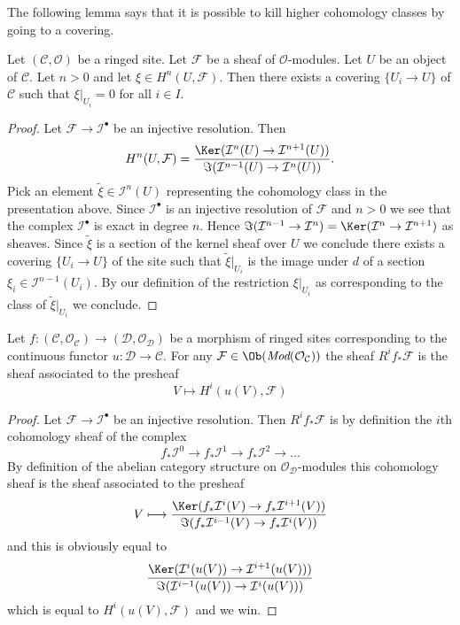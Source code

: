 \medskip\noindent
The following lemma says that it is possible to kill higher cohomology
classes by going to a covering.

\begin{lemma}
\label{lemma-kill-cohomology-class-on-covering}
Let $(\mathcal{C}, \mathcal{O})$ be a ringed site.
Let $\mathcal{F}$ be a sheaf of $\mathcal{O}$-modules.
Let $U$ be an object of $\mathcal{C}$.
Let $n > 0$ and let $\xi \in H^n(U, \mathcal{F})$.
Then there exists a covering $\{U_i \to U\}$ of $\mathcal{C}$
such that $\xi|_{U_i} = 0$ for all $i \in I$.
\end{lemma}

\begin{proof}
Let $\mathcal{F} \to \mathcal{I}^\bullet$ be an injective resolution.
Then
$$
H^n(U, \mathcal{F}) =
\frac{\Ker(\mathcal{I}^n(U) \to \mathcal{I}^{n + 1}(U))}
{\Im(\mathcal{I}^{n - 1}(U) \to \mathcal{I}^n(U))}.
$$
Pick an element $\tilde \xi \in \mathcal{I}^n(U)$ representing the
cohomology class in the presentation above. Since $\mathcal{I}^\bullet$
is an injective resolution of $\mathcal{F}$ and $n > 0$ we see that
the complex $\mathcal{I}^\bullet$ is exact in degree $n$. Hence
$\Im(\mathcal{I}^{n - 1} \to \mathcal{I}^n) =
\Ker(\mathcal{I}^n \to \mathcal{I}^{n + 1})$ as sheaves.
Since $\tilde \xi$ is a section of the kernel sheaf over $U$
we conclude there exists a covering $\{U_i \to U\}$ of the site
such that $\tilde \xi|_{U_i}$ is the image under $d$ of a section
$\xi_i \in \mathcal{I}^{n - 1}(U_i)$. By our definition of the
restriction $\xi|_{U_i}$ as corresponding to the class of
$\tilde \xi|_{U_i}$ we conclude.
\end{proof}

\begin{lemma}
\label{lemma-higher-direct-images}
Let $f : (\mathcal{C}, \mathcal{O}_\mathcal{C}) \to
(\mathcal{D}, \mathcal{O}_\mathcal{D})$ be a morphism of ringed sites
corresponding to the continuous functor $u : \mathcal{D} \to \mathcal{C}$.
For any $\mathcal{F} \in \Ob(\textit{Mod}(\mathcal{O}_\mathcal{C}))$
the sheaf $R^if_*\mathcal{F}$ is the sheaf associated to the
presheaf
$$
V \longmapsto H^i(u(V), \mathcal{F})
$$
\end{lemma}

\begin{proof}
Let $\mathcal{F} \to \mathcal{I}^\bullet$ be an injective resolution.
Then $R^if_*\mathcal{F}$ is by definition the $i$th cohomology sheaf
of the complex
$$
f_*\mathcal{I}^0 \to f_*\mathcal{I}^1 \to f_*\mathcal{I}^2 \to \ldots
$$
By definition of the abelian category structure on
$\mathcal{O}_\mathcal{D}$-modules
this cohomology sheaf is the sheaf associated to the presheaf
$$
V
\longmapsto
\frac{\Ker(f_*\mathcal{I}^i(V) \to f_*\mathcal{I}^{i + 1}(V))}
{\Im(f_*\mathcal{I}^{i - 1}(V) \to f_*\mathcal{I}^i(V))}
$$
and this is obviously equal to
$$
\frac{\Ker(\mathcal{I}^i(u(V)) \to \mathcal{I}^{i + 1}(u(V)))}
{\Im(\mathcal{I}^{i - 1}(u(V)) \to \mathcal{I}^i(u(V)))}
$$
which is equal to $H^i(u(V), \mathcal{F})$
and we win.
\end{proof}






